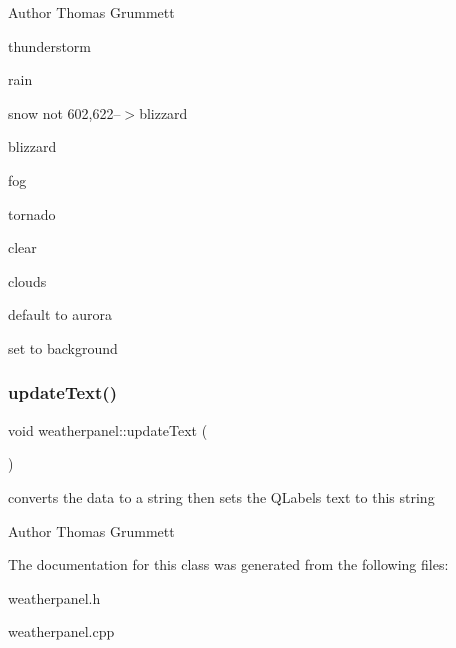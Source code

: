 \begin{DoxyAuthor}{Author}
Thomas Grummett 
\end{DoxyAuthor}
thunderstorm

rain

snow not 602,622--$>$blizzard

blizzard

fog

tornado

clear

clouds

default to aurora

set to background \mbox{\label{classweatherpanel_a8c4de1853c738dcf431f33a7a3ac56e4}} 
\subsubsection{\texorpdfstring{update\+Text()}{updateText()}}
{\footnotesize\ttfamily void weatherpanel\+::update\+Text (\begin{DoxyParamCaption}{ }\end{DoxyParamCaption})}



converts the data to a string then sets the Q\+Labels text to this string 

\begin{DoxyAuthor}{Author}
Thomas Grummett 
\end{DoxyAuthor}


The documentation for this class was generated from the following files\+:\begin{DoxyCompactItemize}
\item 
weatherpanel.\+h\item 
weatherpanel.\+cpp\end{DoxyCompactItemize}
